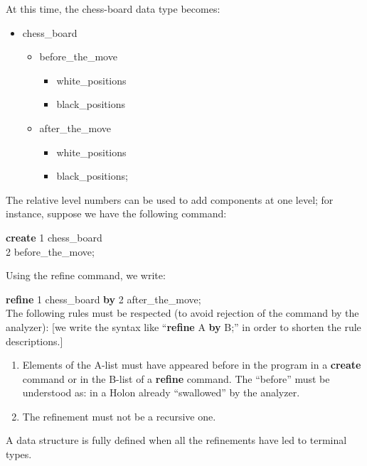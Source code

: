 \documentclass[openany,nobib]{tufte-book}
\newcommand{\kw}[1]{{\bf #1}}
\begin{document}
\medskip\noindent
At this time, the chess-board data type becomes:
\begin{itemize}
    \item[1] chess\_board
    \begin{itemize}
        \item[2] before\_the\_move
        \begin{itemize}
            \item[3] white\_positions
            \item[3] black\_positions
        \end{itemize}
        \item[2] after\_the\_move
        \begin{itemize}
            \item[3] white\_positions
            \item[3] black\_positions;
        \end{itemize}
    \end{itemize}
\end{itemize}
The relative level numbers can be used to add components at one level; for
instance, suppose we have the following command:

\medskip

\-\hspace{0.8cm} \kw{create} 1 chess\_board\\
\-\hspace{3cm} 2 before\_the\_move;

\medskip\noindent
Using the refine command, we write:

\medskip

\-\hspace{0.8cm} \kw{refine} 1 chess\_board \kw{by} 2 after\_the\_move;\\

\medskip\noindent
The following rules must be respected (to avoid rejection of the command by the
analyzer): [we write the syntax like ``\kw{refine} A \kw{by} B;'' in order to
shorten the rule descriptions.]
\begin{enumerate}
    \item Elements of the A-list must have appeared before in the program in a
\kw{create} command or in the B-list of a \kw{refine} command. The ``before''
must be understood as: in a Holon already ``swallowed'' by the analyzer.
    \item The refinement must not be a recursive one.
\end{enumerate}
A data structure is fully defined when all the refinements have led to terminal
types.
\end{document}
